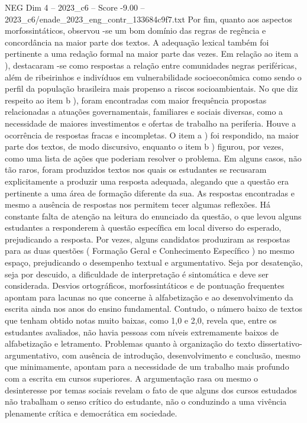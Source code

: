 \begin{textsample}{NEG Dim 4 – 2023\_c6 – Score -9.00 – 2023\_c6/enade\_2023\_eng\_contr\_133684c9f7.txt}
Por fim, quanto aos aspectos morfossintáticos, observou -se um bom domínio das regras de regência e concordância na maior parte dos textos.
A adequação lexical também foi pertinente a uma redação formal na maior parte das vezes.
Em relação ao item a ), destacaram -se como respostas a relação entre comunidades negras periféricas, além de ribeirinhos e indivíduos em vulnerabilidade socioeconômica como sendo o perfil da população brasileira mais propenso a riscos socioambientais.
No que diz respeito ao item b ), foram encontradas com maior frequência propostas relacionadas a atuações governamentais, familiares e sociais diversas, como a necessidade de maiores investimentos e ofertas de trabalho na periferia.
Houve a ocorrência de respostas fracas e incompletas.
O item a ) foi respondido, na maior parte dos textos, de modo discursivo, enquanto o item b ) figurou, por vezes, como uma lista de ações que poderiam resolver o problema.
Em alguns casos, não tão raros, foram produzidos textos nos quais os estudantes se recusaram explicitamente a produzir uma resposta adequada, alegando que a questão era pertinente a uma área de formação diferente da sua.
As respostas encontradas e mesmo a ausência de respostas nos permitem tecer algumas reflexões.
Há constante falta de atenção na leitura do enunciado da questão, o que levou alguns estudantes a responderem à questão específica em local diverso do esperado, prejudicando a resposta.
Por vezes, alguns candidatos produziram as respostas para as duas questões ( Formação Geral e Conhecimento Específico ) no mesmo espaço, prejudicando o desempenho textual e argumentativo.
Seja por desatenção, seja por descuido, a dificuldade de interpretação é sintomática e deve ser considerada.
Desvios ortográficos, morfossintáticos e de pontuação frequentes apontam para lacunas no que concerne à alfabetização e ao desenvolvimento da escrita ainda nos anos do ensino fundamental.
Contudo, o número baixo de textos que tenham obtido notas muito baixas, como 1,0 e 2,0, revela que, entre os estudantes avaliados, não havia pessoas com níveis extremamente baixos de alfabetização e letramento.
Problemas quanto à organização do texto dissertativo-argumentativo, com ausência de introdução, desenvolvimento e conclusão, mesmo que minimamente, apontam para a necessidade de um trabalho mais profundo com a escrita em cursos superiores.
A argumentação rasa ou mesmo o desinteresse por temas sociais revelam o fato de que alguns dos cursos estudados não trabalham o senso crítico do estudante, não o conduzindo a uma vivência plenamente crítica e democrática em sociedade.

\end{textsample}
